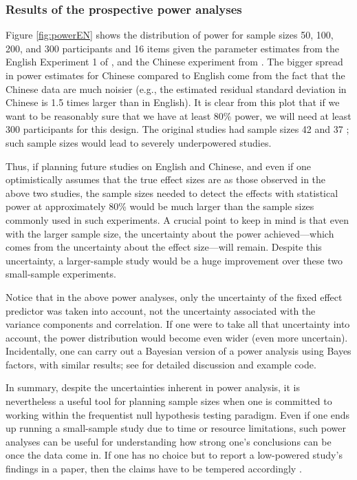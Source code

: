 \documentclass{ar-1col}\usepackage[]{graphicx}\usepackage[]{color}
\begin{document}
\subsubsection{Results of the prospective power analyses}

Figure \ref{fig:powerEN} shows the distribution of power for sample sizes 50, 100, 200, and 300 participants and 16 items given the parameter estimates from the English Experiment 1 of \citet{grodner}, and the Chinese experiment from \citet{gibsonwu}. The bigger spread in power estimates for Chinese compared to English come from the fact that the Chinese data are much noisier (e.g., the estimated residual standard deviation in Chinese is 1.5 times larger than in English). It is clear from this plot that if we want to be reasonably sure that we have at least 80\% power, we will need at least 300 participants for this design. The original studies had sample sizes 42 and 37 \citep[][respectively]{grodner,gibsonwu}; such sample sizes would lead to severely underpowered studies. 

Thus, if planning future studies on English and Chinese, and even if one optimistically assumes that the true effect sizes are as those observed in the above two studies, the sample sizes needed to detect the effects with statistical power at approximately 80\% would be much larger than the sample sizes commonly used in such experiments.  A crucial point to keep in mind is that even with the larger sample size, the uncertainty about the power achieved---which comes from the uncertainty about the effect size---will remain. Despite this uncertainty, a larger-sample study would be a huge improvement over these two small-sample experiments.

Notice that in the above power analyses, only the uncertainty of the fixed effect predictor was taken into account, not the uncertainty associated with the variance components and correlation. If one were to take all that uncertainty into account, the power distribution would become even wider (even more uncertain). Incidentally, one can carry out a Bayesian version of a power analysis using Bayes factors, with similar results; see \citet{vasishth2021sample} for detailed discussion and example code.

In summary, despite the uncertainties inherent in power analysis, it is nevertheless a useful tool for planning sample sizes when one is committed to working within the frequentist null hypothesis testing paradigm. Even if one ends up running a small-sample study due to time or resource limitations, such power analyses can be useful for understanding how strong one's conclusions can be once the data come in. If one has no choice but to report a low-powered study's findings in a paper, then the claims have to be tempered accordingly \cite[see, e.g.,][]{VasishthGelman2021}. 
\end{document}
